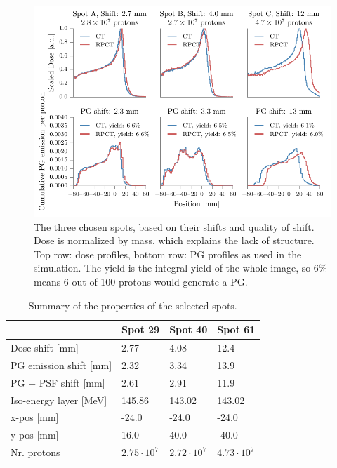 \documentclass[a4paper,english]{article}
\begin{document}
\begin{figure}[htp]
  \centering
  \includegraphics[width=0.99\linewidth]{spotprofiles}
  \caption{The three chosen spots, based on their shifts and quality of shift. Dose is normalized by mass, which explains the lack of structure. Top row: dose profiles, bottom row: PG profiles as used in the simulation. The yield is the integral yield of the whole image, so 6\% means 6 out of 100 protons would generate a PG.}
  \label{fig:the-spots}
\end{figure}

\begin{table}
\centering
\begin{tabular}{llll}
	 & Spot 29 & Spot 40 & Spot 61\\
	\midrule
	Dose shift [mm] & 2.77 & 4.08 & 12.4\\
	PG emission shift [mm] & 2.32 & 3.34 & 13.9\\
	PG + PSF shift [mm] & 2.61 & 2.91 & 11.9\\
	\midrule
	Iso-energy layer [MeV] & 145.86 & 143.02 & 143.02 \\
	x-pos [mm] & -24.0 &  -24.0 &  -24.0 \\
	y-pos [mm] & 16.0 & 40.0 & -40.0 \\
	Nr. protons & $2.75\cdot10^7$ & $2.72\cdot10^7$ & $4.73\cdot10^7$ \\
\end{tabular}
\caption{Summary of the properties of the selected spots.}
\label{table:spotselec}
\end{table}

%
\end{document}
